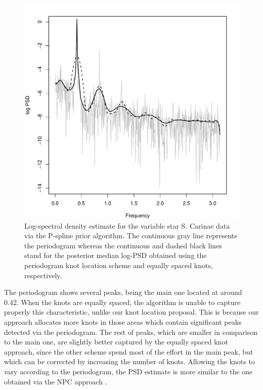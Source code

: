 \documentclass[aps,reprint,amsmath,amssymb,showpacs,showkeys]{revtex4-1}%
\begin{document}
\begin{figure}[]
	\centering
	\includegraphics[scale=0.5,clip=true,angle=0]{carinae.pdf}
	\caption{Log-spectral density estimate for the variable star S. Carinae data via the P-spline prior algorithm. The continuous gray line represents the periodogram whereas the continuous and dashed black lines stand for the posterior median log-PSD obtained using the periodogram knot location scheme and equally spaced knots, respectively.}
	\label{fig:carinae}
\end{figure}

The periodogram shows several peaks, being the main one located at around 0.42.  When the knots are equally spaced, the algorithm is unable to capture properly this characteristic, unlike our knot location proposal.  This is because our approach allocates more knots in those areas which contain significant peaks detected via the periodogram.  The rest of peaks, which are smaller in comparison to the main one, are slightly better captured by the equally spaced knot approach, since the other scheme spend most of the effort in the main peak, but which can be corrected by increasing the number of knots.  Allowing the knots to vary according to the periodogram, the PSD estimate is more similar to the one obtained via the NPC approach \citep{Kirch:2018}.
\end{document}
